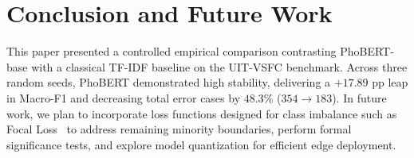 \documentclass[conference]{IEEEtran}
\begin{document}
\section{Conclusion and Future Work}
This paper presented a controlled empirical comparison contrasting PhoBERT-base with a classical TF-IDF baseline on the UIT-VSFC benchmark. Across three random seeds, PhoBERT demonstrated high stability, delivering a $+17.89\text{ pp}$ leap in Macro-F1 and decreasing total error cases by $48.3\%$ ($354 \to 183$). In future work, we plan to incorporate loss functions designed for class imbalance such as Focal Loss~\cite{lin2017focal} to address remaining minority boundaries, perform formal significance tests, and explore model quantization for efficient edge deployment.



\end{document}
